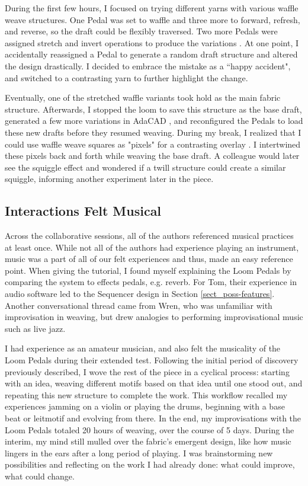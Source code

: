During the first few hours, I focused on trying different yarns with various waffle weave structures. One Pedal was set to waffle and three more to forward, refresh, and reverse, so the draft could be flexibly traversed. Two more Pedals were assigned stretch and invert operations to produce the variations
. At one point, I accidentally reassigned a Pedal to generate a random draft structure and altered the design drastically. I decided to embrace the mistake as a ``happy accident", and switched to a contrasting yarn to further highlight the change. 

Eventually, one of the stretched waffle variants took hold as the main fabric structure. Afterwards, I stopped the loom to save this structure as the base draft, generated a few more variations in AdaCAD 
, and reconfigured the Pedals to load these new drafts before they resumed weaving. During my break, I realized that I could use waffle weave squares as "pixels" for a contrasting overlay 
. I intertwined these pixels back and forth while weaving the base draft. A colleague would later see the squiggle effect and wondered if a twill structure could create a similar squiggle, informing another experiment later in the piece. 

\subsection{Interactions Felt Musical}

Across the collaborative sessions, all of the authors referenced musical practices at least once. While not all of the authors had experience playing an instrument, music was a part of all of our felt experiences and thus, made an easy reference point. When giving the tutorial, I found myself explaining the Loom Pedals by comparing the system to effects pedals, e.g. reverb. For Tom, their experience in audio software led to the Sequencer design in Section \ref{sect_poss-features}. Another conversational thread came from Wren, who was unfamiliar with improvisation in weaving, but drew analogies to performing improvisational music such as live jazz.

I had experience as an amateur musician, and also felt the musicality of the Loom Pedals during their extended test. Following the initial period of discovery previously described, I wove the rest of the piece in a cyclical process: starting with an idea, weaving different motifs based on that idea until one stood out, and repeating this new structure to complete the work. This workflow recalled my experiences jamming on a violin or playing the drums, beginning with a base beat or leitmotif and evolving from there. In the end, my improvisations with the Loom Pedals totaled 20 hours of weaving, over the course of 5 days. During the interim, my mind still mulled over the fabric's emergent design, like how music lingers in the ears after a long period of playing. I was brainstorming new possibilities and reflecting on the work I had already done: what could improve, what could change. 

